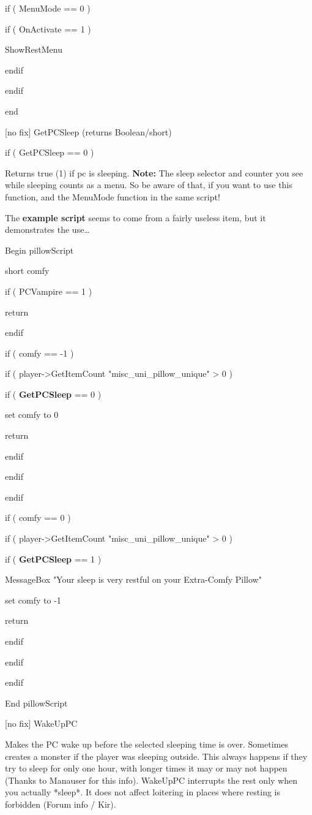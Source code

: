 \documentclass[
]{article}
\begin{document}
if ( MenuMode == 0 )

if ( OnActivate == 1 )

ShowRestMenu

endif

endif

end

{[}no fix{]} GetPCSleep (returns Boolean/short)

if ( GetPCSleep == 0 )

Returns true (1) if pc is sleeping. \textbf{Note:} The sleep selector
and counter you see while sleeping counts as a menu. So be aware of
that, if you want to use this function, and the MenuMode function in the
same script!

The \textbf{example script} seems to come from a fairly useless item,
but it demonstrates the use\ldots{}

Begin pillowScript

short comfy

if ( PCVampire == 1 )

return

endif

if ( comfy == -1 )

if ( player-\textgreater GetItemCount "misc\_uni\_pillow\_unique"
\textgreater{} 0 )

if ( \textbf{GetPCSleep} == 0 )

set comfy to 0

return

endif

endif

endif

if ( comfy == 0 )

if ( player-\textgreater GetItemCount "misc\_uni\_pillow\_unique"
\textgreater{} 0 )

if ( \textbf{GetPCSleep} == 1 )

MessageBox "Your sleep is very restful on your Extra-Comfy Pillow"

set comfy to -1

return

endif

endif

endif

End pillowScript

{[}no fix{]} WakeUpPC

Makes the PC wake up before the selected sleeping time is over.
Sometimes creates a monster if the player was sleeping outside. This
always happens if they try to sleep for only one hour, with longer times
it may or may not happen (Thanks to Manauser for this info). WakeUpPC
interrupts the rest only when you actually *sleep*. It does not affect
loitering in places where resting is forbidden (Forum info / Kir).
\end{document}
